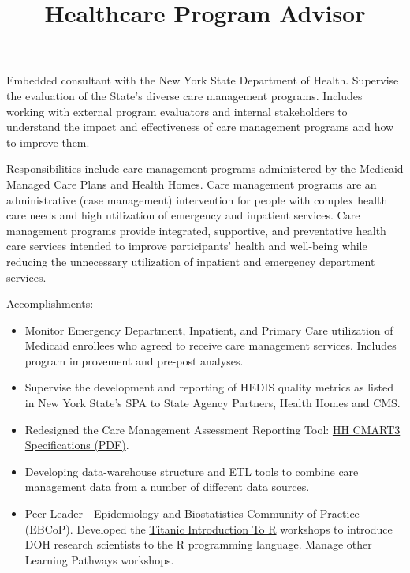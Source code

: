 \documentclass[line, mm, 10pt]{res}
\begin{document}
\begin{resume}
  \title{Healthcare Program Advisor}
  \begin{position}
    Embedded consultant with the New York State Department of
    Health. Supervise the evaluation of the State's diverse care
    management programs. Includes working with external program
    evaluators and internal stakeholders to understand the impact and
    effectiveness of care management programs and how to improve them.

    Responsibilities include care management programs administered by
    the Medicaid Managed Care Plans and Health Homes. Care management
    programs are an administrative (case management) intervention for
    people with complex health care needs and high utilization of
    emergency and inpatient services. Care management programs provide
    integrated, supportive, and preventative health care services
    intended to improve participants' health and well-being while
    reducing the unnecessary utilization of inpatient and emergency
    department services.

    Accomplishments:
    \begin{itemize}
    \item Monitor Emergency Department, Inpatient, and Primary Care
      utilization of Medicaid enrollees who agreed to receive care
      management services. Includes program improvement and pre-post
      analyses.
    \item Supervise the development and reporting of HEDIS quality
      metrics as listed in New York State's SPA to State Agency
      Partners, Health Homes and CMS.
    \item Redesigned the Care Management Assessment Reporting Tool:
      \href{https://www.health.ny.gov/health_care/medicaid/program/medicaid_health_homes/assessment_quality_measures/docs/hh_cmart_specs_v3.pdf}{HH
        CMART3 Specifications (PDF)}.
    \item Developing data-warehouse structure and ETL tools to combine
      care management data from a number of different data sources.
    \item Peer Leader - Epidemiology and Biostatistics Community of
      Practice (EBCoP). Developed the
      \href{http://choens.github.io/titanic/}{Titanic Introduction To
        R} workshops to introduce DOH research scientists to the R
      programming language. Manage other Learning Pathways workshops.
    \end{itemize}
  \end{position}


\end{resume}
\end{document}
